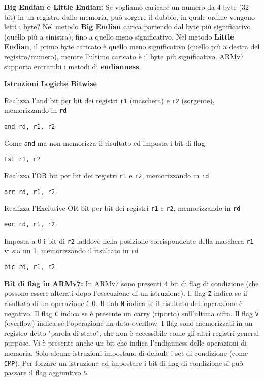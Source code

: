\begin{defn}
\textbf{Big Endian e Little Endian:} Se vogliamo caricare un numero da 4 byte (32 bit) in un registro dalla memoria, può sorgere il dubbio, in quale ordine vengono letti i byte? Nel metodo \textbf{Big Endian} carica partendo dal byte più significativo (quello più a sinistra), fino a quello meno significativo. Nel metodo \textbf{Little Endian}, il primo byte caricato è quello meno significativo (quello più a destra del registro/numero), mentre l'ultimo caricato è il byte più significativo. ARMv7 supporta entrambi i metodi di \textbf{endianness}.
\end{defn}

\begin{defn}
\textbf{Istruzioni Logiche Bitwise}

Realizza l'and bit per bit dei registri \texttt{r1} (maschera) e \texttt{r2} (sorgente), memorizzando in \texttt{rd}
\begin{lstlisting}[style=arm]
and rd, r1, r2
\end{lstlisting}

Come \texttt{and} ma non memorizza il risultato ed imposta i bit di flag.
\begin{lstlisting}[style=arm]
tst r1, r2
\end{lstlisting}

Realizza l'OR bit per bit dei registri \texttt{r1} e \texttt{r2}, memorizzando in \texttt{rd}
\begin{lstlisting}[style=arm]
orr rd, r1, r2
\end{lstlisting}

Realizza l'Exclusive OR bit per bit dei registri \texttt{r1} e \texttt{r2}, memorizzando in \texttt{rd}
\begin{lstlisting}[style=arm]
eor rd, r1, r2
\end{lstlisting}

Imposta a 0 i bit di \texttt{r2} laddove nella posizione corrispondente della maschera \texttt{r1} vi sia un 1, memorizzando il risultato in \texttt{rd}
\begin{lstlisting}[style=arm]
bic rd, r1, r2
\end{lstlisting}
\end{defn}

\begin{defn}
\textbf{Bit di flag in ARMv7:}
In ARMv7 sono presenti 4 bit di flag di condizione (che possono essere alterati dopo l'esecuzione di un istruzione). Il flag \texttt{Z} indica se il risultato di un operazione è 0. Il flab \texttt{N} indica se il risultato dell'operazione è negativo. Il flag \texttt{C} indica se è presente un carry (riporto) sull'ultima cifra. Il flag \texttt{V} (overflow) indica se l'operazione ha dato overflow. I flag sono memorizzati in un registro detto "parola di stato", che non è accessibile come gli altri registri general purpose. Vi è presente anche un bit che indica l'endianness delle operazioni di memoria.
Solo alcune istruzioni impostano di default i set di condizione (come \texttt{CMP}). Per forzare un istruzione ad impostare i bit di flag di condizione si può passare il flag aggiuntivo \texttt{S}.
\end{defn}

